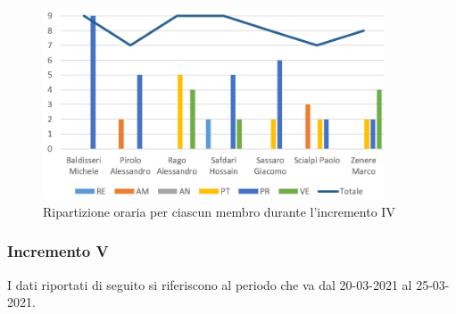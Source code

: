 \begin{figure}[!htb]   
    \centering
    \includegraphics[width=0.9\textwidth]{Images/inc4}
	\caption{Ripartizione oraria per ciascun membro durante l'incremento IV}
\end{figure}

\subsubsection{Incremento V}

I dati riportati di seguito si riferiscono al periodo che va dal 20-03-2021 al 25-03-2021.

